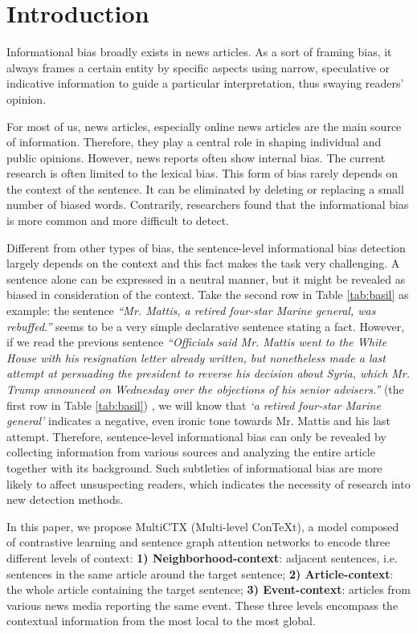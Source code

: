 \section{Introduction}
Informational bias broadly exists in news articles. As a sort of framing bias, it always frames a certain entity by specific aspects using narrow, speculative or indicative information  to guide a particular interpretation, thus swaying readers' opinion. 

For most of us, news articles, especially online news articles are the main source of information. Therefore, they play a central role in shaping individual and public opinions. However, news reports often show internal bias. The current research is often limited to the lexical bias. This form of bias rarely depends on the context of the sentence. It can be eliminated by deleting or replacing a small number of biased words. Contrarily, researchers \citet{fan-etal-2019-plain} found that the informational bias is more common and more difficult to detect.

Different from other types of bias, the sentence-level informational bias detection largely depends on the context and this fact makes the task very challenging. A sentence alone can be expressed in a neutral manner, but it might be revealed as biased in consideration of the context. Take the second row in Table \ref{tab:basil} as example: the sentence \textit{``Mr. Mattis, a retired four-star Marine general, was rebuffed.''} \label{sent:mattis} seems to be a very simple declarative sentence stating a fact. However, if we read the previous sentence \textit{``Officials said Mr. Mattis went to the White House with his resignation letter already written, but nonetheless made a last attempt at persuading the president to reverse his decision about Syria, which Mr. Trump announced on Wednesday over the objections of his senior advisers.''} (the first row in Table \ref{tab:basil}) , we will know that \textit{`a retired four-star Marine general'} indicates a negative, even ironic tone towards Mr. Mattis and his last attempt. Therefore, sentence-level informational bias can only be revealed by collecting information from various sources and analyzing the entire article together with its background. Such subtleties of informational bias are more likely to affect unsuspecting readers, which indicates the necessity of research into new detection methods. 

In this paper, we propose MultiCTX (Multi-level ConTeXt), a model composed of contrastive learning and sentence graph attention networks to encode three different levels of context:  \textbf{1) Neighborhood-context}: adjacent sentences, i.e. sentences in the same article around the target sentence; \textbf{2) Article-context}: the whole article containing the target sentence; \textbf{3) Event-context}: articles from various news media reporting the same event. These three levels encompass the contextual information from the most local to the most global.

